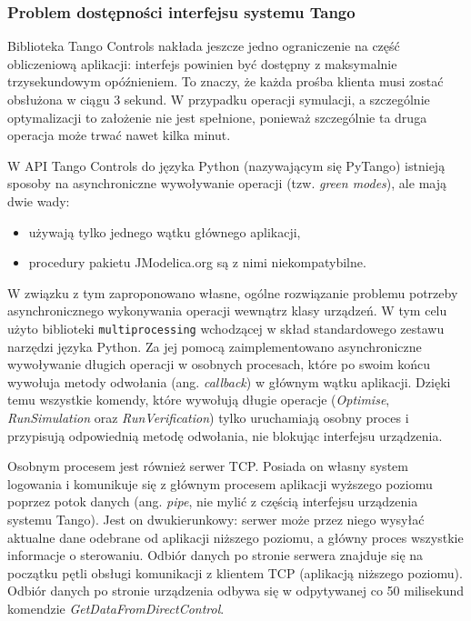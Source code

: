 \subsubsection{Problem dostępności interfejsu systemu Tango}

Biblioteka Tango Controls nakłada jeszcze jedno ograniczenie na część obliczeniową aplikacji: interfejs powinien być dostępny z maksymalnie trzysekundowym opóźnieniem. To znaczy, że każda prośba klienta musi zostać obsłużona w ciągu 3 sekund. W przypadku operacji symulacji, a szczególnie optymalizacji to założenie nie jest spełnione, ponieważ szczególnie ta druga operacja może trwać nawet kilka minut.

W API Tango Controls do języka Python (nazywającym się PyTango) istnieją sposoby na asynchroniczne wywoływanie operacji (tzw. \emph{green modes}), ale mają dwie wady:
\begin{itemize}
    \item używają tylko jednego wątku głównego aplikacji,
    \item procedury pakietu JModelica.org są z nimi niekompatybilne.
\end{itemize}

W związku z tym zaproponowano własne, ogólne rozwiązanie problemu potrzeby asynchronicznego wykonywania operacji wewnątrz klasy urządzeń. W tym celu użyto biblioteki \texttt{multiprocessing} wchodzącej w skład standardowego zestawu narzędzi języka Python. Za jej pomocą zaimplementowano asynchroniczne wywoływanie długich operacji w osobnych procesach, które po swoim końcu wywołuja metody odwołania (ang. \emph{callback}) w głównym wątku aplikacji. Dzięki temu wszystkie komendy, które wywołują długie operacje (\emph{Optimise}, \emph{RunSimulation} oraz \emph{RunVerification}) tylko uruchamiają osobny proces i przypisują odpowiednią metodę odwołania, nie blokując interfejsu urządzenia.

Osobnym procesem jest również serwer TCP. Posiada on własny system logowania i komunikuje się z głównym procesem aplikacji wyższego poziomu poprzez potok danych (ang. \emph{pipe}, nie mylić z częścią interfejsu urządzenia systemu Tango). Jest on dwukierunkowy: serwer może przez niego wysyłać aktualne dane odebrane od aplikacji niższego poziomu, a główny proces wszystkie informacje o sterowaniu. Odbiór danych po stronie serwera znajduje się na początku pętli obsługi komunikacji z klientem TCP (aplikacją niższego poziomu). Odbiór danych po stronie urządzenia odbywa się w odpytywanej co 50 milisekund komendzie \emph{GetDataFromDirectControl}.

